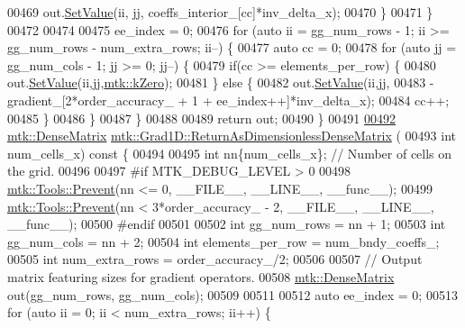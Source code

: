 \begin{DoxyCode}
{{00469       out.\hyperlink{classmtk_1_1DenseMatrix_a784ce5784109ac86bfb9d8562b334b13}{SetValue}(ii, jj, coeffs\_interior\_[cc]*inv\_delta\_x);
00470     \}
00471   \}
00472 
00474 
00475   ee\_index = 0;
00476   \textcolor{keywordflow}{for} (\textcolor{keyword}{auto} ii = gg\_num\_rows - 1; ii >= gg\_num\_rows - num\_extra\_rows; ii--) \{
00477     \textcolor{keyword}{auto} cc = 0;
00478     \textcolor{keywordflow}{for} (\textcolor{keyword}{auto} jj = gg\_num\_cols - 1; jj >= 0; jj--) \{
00479       \textcolor{keywordflow}{if}(cc >= elements\_per\_row) \{
00480         out.\hyperlink{classmtk_1_1DenseMatrix_a784ce5784109ac86bfb9d8562b334b13}{SetValue}(ii,jj,\hyperlink{group__c01-roots_ga59a451a5fae30d59649bcda274fea271}{mtk::kZero});
00481       \} \textcolor{keywordflow}{else} \{
00482         out.\hyperlink{classmtk_1_1DenseMatrix_a784ce5784109ac86bfb9d8562b334b13}{SetValue}(ii,jj,
00483                      -gradient\_[2*order\_accuracy\_ + 1 + ee\_index++]*inv\_delta\_x);
00484         cc++;
00485       \}
00486      \}
00487   \}
00488 
00489   \textcolor{keywordflow}{return} out;
00490 \}
00491 
\hypertarget{mtk__grad__1d_8cc_source_l00492}{}\hyperlink{classmtk_1_1Grad1D_ab07e6a15edca32534ae3d1a8ccaf1c42}{00492} \hyperlink{classmtk_1_1DenseMatrix}{mtk::DenseMatrix} \hyperlink{classmtk_1_1Grad1D_ab07e6a15edca32534ae3d1a8ccaf1c42}{mtk::Grad1D::ReturnAsDimensionlessDenseMatrix}
      (
00493   \textcolor{keywordtype}{int} num\_cells\_x)\textcolor{keyword}{ const }\{
00494 
00495   \textcolor{keywordtype}{int} nn\{num\_cells\_x\}; \textcolor{comment}{// Number of cells on the grid.}
00496 
00497 \textcolor{preprocessor}{  #if MTK\_DEBUG\_LEVEL > 0}
00498   \hyperlink{classmtk_1_1Tools_a332324c6f25e66be9dff48c5987a3b9f}{mtk::Tools::Prevent}(nn <= 0, \_\_FILE\_\_, \_\_LINE\_\_, \_\_func\_\_);
00499   \hyperlink{classmtk_1_1Tools_a332324c6f25e66be9dff48c5987a3b9f}{mtk::Tools::Prevent}(nn < 3*order\_accuracy\_ - 2, \_\_FILE\_\_, \_\_LINE\_\_, \_\_func\_\_);
00500 \textcolor{preprocessor}{  #endif}
00501 
00502   \textcolor{keywordtype}{int} gg\_num\_rows = nn + 1;
00503   \textcolor{keywordtype}{int} gg\_num\_cols = nn + 2;
00504   \textcolor{keywordtype}{int} elements\_per\_row = num\_bndy\_coeffs\_;
00505   \textcolor{keywordtype}{int} num\_extra\_rows = order\_accuracy\_/2;
00506 
00507   \textcolor{comment}{// Output matrix featuring sizes for gradient operators.}
00508   \hyperlink{classmtk_1_1DenseMatrix}{mtk::DenseMatrix} out(gg\_num\_rows, gg\_num\_cols);
00509 
00511 
00512   \textcolor{keyword}{auto} ee\_index = 0;
00513   \textcolor{keywordflow}{for} (\textcolor{keyword}{auto} ii = 0; ii < num\_extra\_rows; ii++) \{
}}
\end{DoxyCode}
